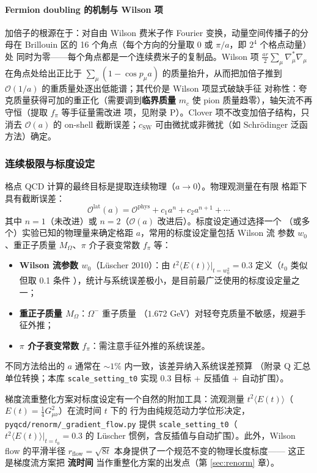 \documentclass[11pt,a4paper]{ctexart}
\newcommand{\order}[1]{\mathcal{O}(#1)}
\newcommand{\code}[1]{\texttt{#1}}
\begin{document}
\paragraph{Fermion doubling 的机制与 Wilson 项}加倍子的根源在于：对自由
Wilson 费米子作 Fourier 变换，动量空间传播子的分母在 Brillouin 区的
16 个角点（每个方向的分量取 $0$ 或 $\pi/a$，即 $2^4$ 个格点动量）处
同时为零——每个角点都是一个连续费米子的复制品。Wilson 项
$\frac{ar}{2}\sum_\mu\nabla_\mu^*\nabla_\mu$ 在角点处给出正比于
$\sum_\mu(1-\cos p_\mu a)$ 的质量抬升，从而把加倍子推到
$\order{1/a}$ 的重质量处逐出低能谱；其代价是 Wilson 项显式破缺手征
对称性：夸克质量获得可加的重正化（需要调到\textbf{临界质量}
$m_c$ 使 pion 质量趋零），轴矢流不再守恒（提取 $f_\pi$ 等手征量需改进
项，见附录 P）。Clover 项不改变加倍子结构，只消去 $\order{a}$ 的
on-shell 截断误差；$c_{\text{SW}}$ 可由微扰或非微扰（如 Schr\"odinger
泛函方法）确定。

\subsubsection{连续极限与标度设定}

格点 QCD 计算的最终目标是提取连续物理（$a \to 0$）。物理观测量在有限
格距下具有截断误差：
\begin{equation}
\mathcal{O}^{\text{lat}}(a) = \mathcal{O}^{\text{phys}} + c_1 a^n
+ c_2 a^{n+1} + \cdots
\end{equation}
其中 $n=1$（未改进）或 $n=2$（$\order{a}$ 改进后）。标度设定通过选择一个
（或多个）实验已知的物理量来确定格距 $a$，常用的标度设定量包括 Wilson 流
参数 $w_0$、重正子质量 $M_\Omega$、$\pi$ 介子衰变常数 $f_\pi$ 等：
\begin{itemize}
  \item \textbf{Wilson 流参数 $w_0$}（L\"uscher 2010）：由
  $t^2\langle E(t)\rangle|_{t=w_0^2}=0.3$ 定义（$t_0$ 类似但取 0.1 条件
  ），统计与系统误差极小，是目前最广泛使用的标度设定量之一；
  \item \textbf{重正子质量 $M_\Omega$}：$\Omega^-$ 重子质量
  （$1.672$ GeV）对轻夸克质量不敏感，规避手征外推；
  \item \textbf{$\pi$ 介子衰变常数 $f_\pi$}：需注意手征外推的系统误差。
\end{itemize}
不同方法给出的 $a$ 通常在 $\sim1\%$ 内一致，该差异纳入系统误差预算
（附录 Q 汇总单位转换；本库 \code{scale\_setting\_t0} 实现 0.3 目标 +
反插值 + 自动扩围）。

梯度流重整化方案对标度设定有一个自然的附加工具：流观测量
$t^2\langle E(t)\rangle$（$E(t)=\frac14 G^2_{\mu\nu}$）在流时间 $t$ 下的
行为由纯规范动力学位形决定，\code{pyqcd/renorm/\_gradient\_flow.py} 提供
\code{scale\_setting\_t0}（$t^2\langle E(t)\rangle|_{t=t_0}=0.3$ 的 Lüscher
惯例，含反插值与自动扩围）。此外，Wilson flow 的平滑半径
$r_{\mathrm{flow}}=\sqrt{8t}$ 本身提供了一个规范不变的物理长度标度——
这正是梯度流方案把 \textbf{流时间} 当作重整化方案的出发点（第
\ref{sec:renorm} 章）。
\end{document}

